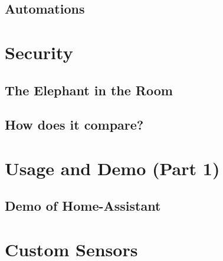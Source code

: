 \documentclass[aspectratio=169]{beamer}
\begin{document}
\subsection{Automations}
\frame{\subsectionpage}

\section{Security}
\frame{\sectionpage}
\subsection{The Elephant in the Room}
\frame{\subsectionpage}
\subsection{How does it compare?}
\frame{\subsectionpage}

\section{Usage and Demo (Part 1)}
\frame{\sectionpage}
\subsection{Demo of Home-Assistant}
\frame{\subsectionpage}

\section{Custom Sensors}
\frame{\sectionpage}
\end{document}
